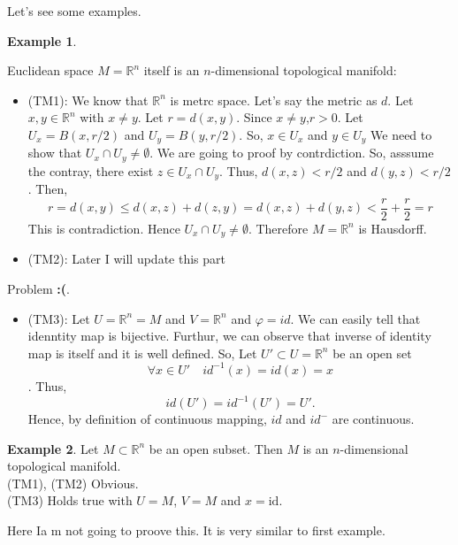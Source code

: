 \documentclass[
]{book}
\providecommand{\tightlist}{%
  \setlength{\itemsep}{0pt}\setlength{\parskip}{0pt}}
\theoremstyle{definition}
\theoremstyle{definition}
\newtheorem{example}{Example}[chapter]
\theoremstyle{definition}
\theoremstyle{definition}
\theoremstyle{remark}
\begin{document}
Let's see some examples.

\begin{example}
\protect\hypertarget{exm:unnamed-chunk-8}{}\label{exm:unnamed-chunk-8}

Euclidean space \(M=\mathbb{R}^n\) itself is an \(n\)-dimensional topological manifold:

\begin{itemize}
\tightlist
\item
  (TM1): We know that \(\mathbb{R}^n\) is metrc space. Let's say the metric as \(d\). Let \(x,y\in \mathbb{R}^n\) with \(x\neq y\).
  Let \(r=d(x,y)\). Since \(x\neq y\),\(r>0\).
  Let \(U_x=B(x,r/2)\) and \(U_y=B(y,r/2)\).
  So, \(x\in U_x\) and \(y\in U_y\) We need to show that \(U_x \cap U_y\neq \emptyset\). We are going to proof by contrdiction. So, asssume the contray, there exist \(z\in U_x\cap U_y\). Thus,
  \(d(x,z)<r/2\) and \(d(y,z)<r/2\). Then,
  \[r=d(x,y)\leq d(x,z)+d(z,y)=d(x,z)+d(y,z)<\frac{r}{2}+\frac{r}{2}=r\]
  This is contradiction. Hence \(U_x\cap U_y \neq \emptyset\). Therefore \(M=\mathbb{R}^n\) is Hausdorff.
\item
  (TM2): Later I will update this part
\end{itemize}

{Problem \textbf{:(}}.

\begin{itemize}
\tightlist
\item
  (TM3): Let \(U=\mathbb{R}^n=M\) and \(V=\mathbb{R}^n\) and \(\varphi=id\). We can easily tell that idenntity map is bijective. Furthur, we can observe that inverse of identity map is itself and it is well defined.
  So, Let \(U'\subset U=\mathbb{R}^n\) be an open set
  \[\forall x\in U'\quad id^{-1}(x)=id(x)=x\]. Thus, \[id(U')=id^{-1}(U')=U'.\] Hence, by definition of continuous mapping, \(id\) and \(id^{-}\) are continuous.
\end{itemize}

\end{example}

\begin{example}
\protect\hypertarget{exm:unnamed-chunk-9}{}\label{exm:unnamed-chunk-9}Let \(M \subset \mathbb{R}^n\) be an open subset. Then \(M\) is an \(n\)-dimensional topological manifold.\\
(TM1), (TM2) Obvious.\\
(TM3) Holds true with \(U = M\), \(V = M\) and \(x = \text{id}\).

Here Ia m not going to proove this. It is very similar to first example.
\end{example}
\end{document}
